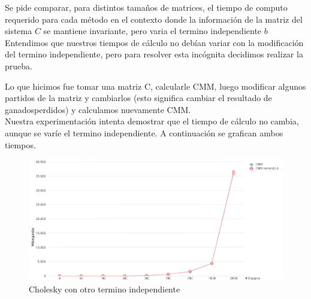 Se pide comparar, para distintos tamaños de matrices, el tiempo de computo requerido para cada método en el contexto donde la información de la matriz del sistema $C$ se mantiene invariante,
pero varia el termino independiente $b$ \\

Entendimos que nuestros tiempos de cálculo no debían variar con la modificación del termino independiente, pero para resolver esta incógnita decidimos realizar la prueba.

Lo que hicimos fue tomar una matriz C, calcularle CMM, luego modificar algunos partidos de la matriz y cambiarlos (esto significa cambiar el resultado de ganados\/perdidos) y calculamos
nuevamente CMM. \\

Nuestra experimentación intenta demostrar que el tiempo de cálculo no cambia, aunque se varíe el termino independiente.
A continuación se grafican ambos tiempos.\\

\begin{figure}[H]
    \centering
    \includegraphics[width=1\textwidth]{IMG/Cholesky con otro termino independiente.png}
    \caption{Cholesky con otro termino independiente}
    \label{fig:Cholesky con otro termino independiente}
\end{figure}



